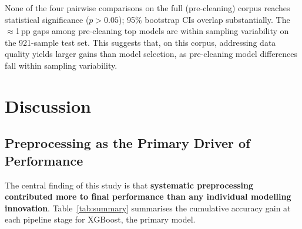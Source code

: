 \documentclass[conference]{IEEEtran}
\begin{document}
\begin{table}[htbp]
\caption{Bootstrap 95\% Confidence Intervals ($B=2{,}000$)}
\label{tab:bootstrap}
\centering
{}
\end{table}

None of the four pairwise comparisons on the full (pre-cleaning)
corpus reaches statistical significance ($p>0.05$); 95\%
bootstrap CIs overlap substantially. The $\approx$1\,pp gaps
among pre-cleaning top models are within sampling variability
on the 921-sample test set. This suggests that, on this corpus, addressing data quality
yields larger gains than model selection, as pre-cleaning model
differences fall within sampling variability.

\section{Discussion}

\subsection{Preprocessing as the Primary Driver of Performance}

The central finding of this study is that \textbf{systematic
preprocessing contributed more to final performance than any
individual modelling innovation}. Table~\ref{tab:summary}
summarises the cumulative accuracy gain at each pipeline stage
for XGBoost, the primary model.
\end{document}

